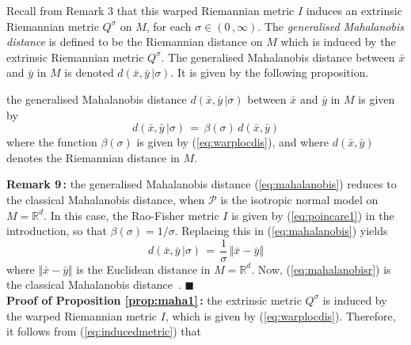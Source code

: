 \documentclass{svmult}
\begin{document}
Recall from Remark 3 that this warped Riemannian metric $I$ induces an extrinsic Riemannian metric $Q^\sigma$ on $M$, for each $\sigma \in (0\,,\infty)$. The \textit{generalised Mahalanobis distance} is defined to be the Riemannian distance on $M$ which is induced by the extrinsic Riemannian metric $Q^\sigma$. The generalised Mahalanobis distance between $\bar{x}$ and $\bar{y}$ in $M$ is denoted $d(\bar{x},\bar{y}\,|\sigma)$. It is given by the following proposition.
\begin{proposition} \label{prop:maha1}
 the generalised Mahalanobis distance $d(\bar{x},\bar{y}\,|\sigma)$ between $\bar{x}$ and $\bar{y}$ in $M$ is given by
\begin{equation} \label{eq:mahalanobis}
  d(\bar{x},\bar{y}\,|\sigma) \,=\, \beta(\sigma)\,d(\bar{x},\bar{y})
\end{equation}
where the function $\beta(\sigma)$ is given by (\ref{eq:warplocdis}), and where $d(\bar{x},\bar{y})$ denotes the Riemannian distance in $M$. 
\end{proposition}
\textbf{Remark 9\,:} the generalised Mahalanobis distance (\ref{eq:mahalanobis}) reduces to the classical Mahalanobis distance, when $\mathcal{P}$ is the isotropic normal model on $M = \mathbb{R}^d$. In this case, the Rao-Fisher metric $I$ is given by (\ref{eq:poincare1}) in the introduction, so that $\beta(\sigma) = 1/\sigma$. Replacing this in (\ref{eq:mahalanobis}) yields
\begin{equation} \label{eq:mahalanobisr}
  d(\bar{x},\bar{y}\,|\sigma) \,=\, \frac{1}{\sigma}\,\Vert\bar{x} - \bar{y}\Vert 
\end{equation}
where $\Vert\bar{x} - \bar{y}\Vert$ is the Euclidean distance in $M = \mathbb{R}^d$. Now, (\ref{eq:mahalanobisr}) is the classical Mahalanobis distance~\cite{maclahlan}. 
\hfill$\blacksquare$ \\[0.1cm]
\textbf{Proof of Proposition \ref{prop:maha1}\,:} the extrinsic metric $Q^\sigma$ is induced by the warped Riemannian metric $I$, which is given by (\ref{eq:warplocdis}). Therefore, it follows from (\ref{eq:inducedmetric}) that
\end{document}
